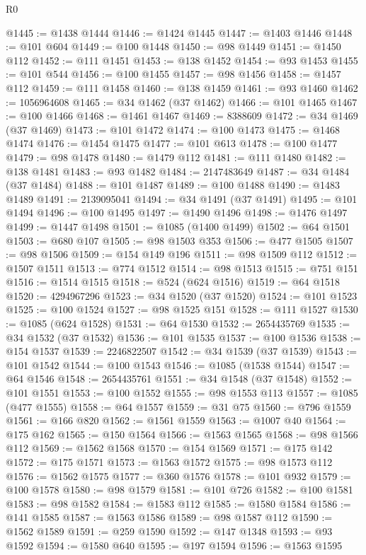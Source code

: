 \begin{lexlean}{R0}
\begin{coremodule}
@1445 := @1438 @1444
@1446 := @1424 @1445
@1447 := @1403 @1446
@1448 := @101 @604
@1449 := @100 @1448
@1450 := @98 @1449
@1451 := @1450 @112
@1452 := @111 @1451
@1453 := @138 @1452
@1454 := @93 @1453
@1455 := @101 @544
@1456 := @100 @1455
@1457 := @98 @1456
@1458 := @1457 @112
@1459 := @111 @1458
@1460 := @138 @1459
@1461 := @93 @1460
@1462 := 1056964608
@1465 := @34 @1462 (@37 @1462)
@1466 := @101 @1465
@1467 := @100 @1466
@1468 := @1461 @1467
@1469 := 8388609
@1472 := @34 @1469 (@37 @1469)
@1473 := @101 @1472
@1474 := @100 @1473
@1475 := @1468 @1474
@1476 := @1454 @1475
@1477 := @101 @613
@1478 := @100 @1477
@1479 := @98 @1478
@1480 := @1479 @112
@1481 := @111 @1480
@1482 := @138 @1481
@1483 := @93 @1482
@1484 := 2147483649
@1487 := @34 @1484 (@37 @1484)
@1488 := @101 @1487
@1489 := @100 @1488
@1490 := @1483 @1489
@1491 := 2139095041
@1494 := @34 @1491 (@37 @1491)
@1495 := @101 @1494
@1496 := @100 @1495
@1497 := @1490 @1496
@1498 := @1476 @1497
@1499 := @1447 @1498
@1501 := @1085 (@1400 @1499)
@1502 := @64 @1501
@1503 := @680 @107
@1505 := @98 @1503 @353
@1506 := @477 @1505
@1507 := @98 @1506
@1509 := @154 @149 @196
@1511 := @98 @1509 @112
@1512 := @1507 @1511
@1513 := @774 @1512
@1514 := @98 @1513
@1515 := @751 @151
@1516 := @1514 @1515
@1518 := @524 (@624 @1516)
@1519 := @64 @1518
@1520 := 4294967296
@1523 := @34 @1520 (@37 @1520)
@1524 := @101 @1523
@1525 := @100 @1524
@1527 := @98 @1525 @151
@1528 := @111 @1527
@1530 := @1085 (@624 @1528)
@1531 := @64 @1530
@1532 := 2654435769
@1535 := @34 @1532 (@37 @1532)
@1536 := @101 @1535
@1537 := @100 @1536
@1538 := @154 @1537
@1539 := 2246822507
@1542 := @34 @1539 (@37 @1539)
@1543 := @101 @1542
@1544 := @100 @1543
@1546 := @1085 (@1538 @1544)
@1547 := @64 @1546
@1548 := 2654435761
@1551 := @34 @1548 (@37 @1548)
@1552 := @101 @1551
@1553 := @100 @1552
@1555 := @98 @1553 @113
@1557 := @1085 (@477 @1555)
@1558 := @64 @1557
@1559 := @31 @75
@1560 := @796 @1559
@1561 := @166 @820
@1562 := @1561 @1559
@1563 := @1007 @40
@1564 := @175 @162
@1565 := @150 @1564
@1566 := @1563 @1565
@1568 := @98 @1566 @112
@1569 := @1562 @1568
@1570 := @154 @1569
@1571 := @175 @142
@1572 := @175 @1571
@1573 := @1563 @1572
@1575 := @98 @1573 @112
@1576 := @1562 @1575
@1577 := @360 @1576
@1578 := @101 @932
@1579 := @100 @1578
@1580 := @98 @1579
@1581 := @101 @726
@1582 := @100 @1581
@1583 := @98 @1582
@1584 := @1583 @112
@1585 := @1580 @1584
@1586 := @141 @1585
@1587 := @1563 @1586
@1589 := @98 @1587 @112
@1590 := @1562 @1589
@1591 := @259 @1590
@1592 := @147 @1348
@1593 := @93 @1592
@1594 := @1580 @640
@1595 := @197 @1594
@1596 := @1563 @1595

\end{coremodule}
\end{lexlean}
